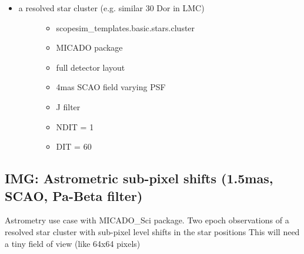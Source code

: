 \begin{itemize}
\item 
\begin{description}
\item[{a resolved star cluster (e.g. similar 30 Dor in LMC)}] \leavevmode 
\begin{itemize}
\item scopesim\_templates.basic.stars.cluster

\item MICADO package

\item full detector layout

\item 4mas SCAO field varying PSF

\item J filter

\item NDIT = 1

\item DIT = 60
\end{itemize}

\end{description}
\end{itemize}


\subsection{IMG: Astrometric sub-pixel shifts (1.5mas, SCAO, Pa-Beta  filter)%
  \label{img-astrometric-sub-pixel-shifts-1-5mas-scao-pa-beta-filter}%
}

Astrometry use case with MICADO\_Sci package.
Two epoch observations of a resolved star cluster with sub-pixel level shifts in the star positions
This will need a tiny field of view (like 64x64 pixels)

